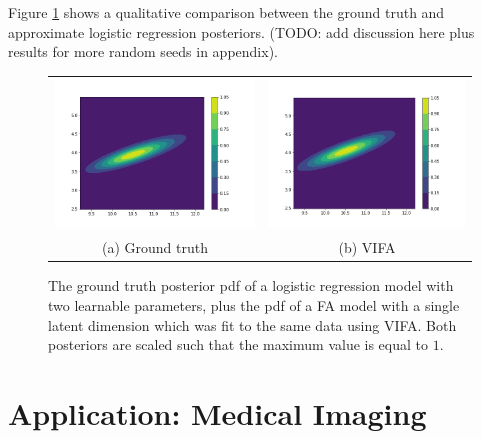 \documentclass[10pt]{article} %
\begin{document}
Figure \ref{fig:logistic_regression_synthetic_data_posterior} shows a qualitative comparison between the ground truth and approximate logistic regression posteriors. (TODO: add discussion here plus results for more random seeds in appendix).
\begin{figure}[!htbp] 
\begin{center}
\begin{tabular}{cc}
	\includegraphics[width=70mm]{plots/logistic_regression_synthetic_true_posterior.png}
	& \includegraphics[width=70mm]{plots/logistic_regression_synthetic_vifa_posterior.png} \\
	(a) Ground truth
	& (b) VIFA \\[6pt]
\end{tabular}
\end{center}
\caption{The ground truth posterior pdf of a logistic regression model with two learnable parameters, plus the pdf of a FA model with a single latent dimension which was fit to the same data using VIFA. Both posteriors are scaled such that the maximum value is equal to $1$.}
\label{fig:logistic_regression_synthetic_data_posterior}
\end{figure}

\section{Application: Medical Imaging}
\end{document}
